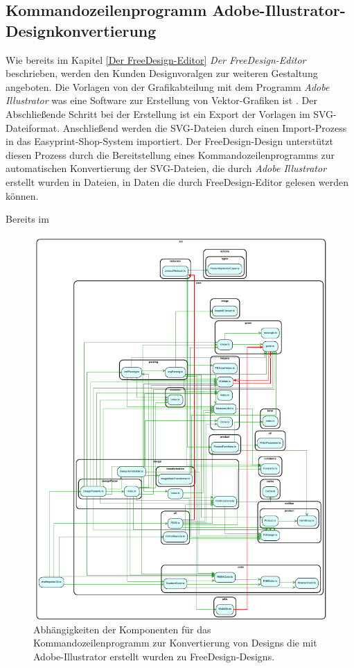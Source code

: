 \subsection{Kommandozeilenprogramm Adobe-Illustrator-Designkonvertierung}

Wie bereits im Kapitel \ref{Der FreeDesign-Editor} \emph{Der FreeDesign-Editor} beschrieben, werden den Kunden Designvoralgen zur weiteren Gestaltung angeboten. 
Die Vorlagen von der Grafikabteilung mit dem Programm \emph{Adobe Illustrator} was eine Software zur Erstellung von Vektor-Grafiken ist \autocite[vgl.][]{Adobe:Illustrator}. Der Abschließende Schritt bei der Erstellung ist ein Export der Vorlagen im SVG-Dateiformat. Anschließend werden die SVG-Dateien durch einen Import-Prozess in das Easyprint-Shop-System importiert. Der FreeDesign-Design unterstützt diesen Prozess durch die Bereitstellung eines Kommandozeilenprogramms zur automatischen Konvertierung der SVG-Dateien, die durch \emph{Adobe Illustrator} erstellt wurden in Dateien, in Daten die durch FreeDesign-Editor gelesen werden können.  

Bereits im 

\begin{figure}[H]
    \centering
    \includegraphics{diagrams/Ist-Architektur/draftImporter-analysis.pdf}
    \caption{Abhängigkeiten der Komponenten für das Kommandozeilenprogramm zur Konvertierung von Designs die mit Adobe-Illustrator erstellt wurden zu FreeDesign-Designs.}
    \label{fig:DesignImport}
\end{figure}

\begin{multicols}{2}    
    
\end{multicols}